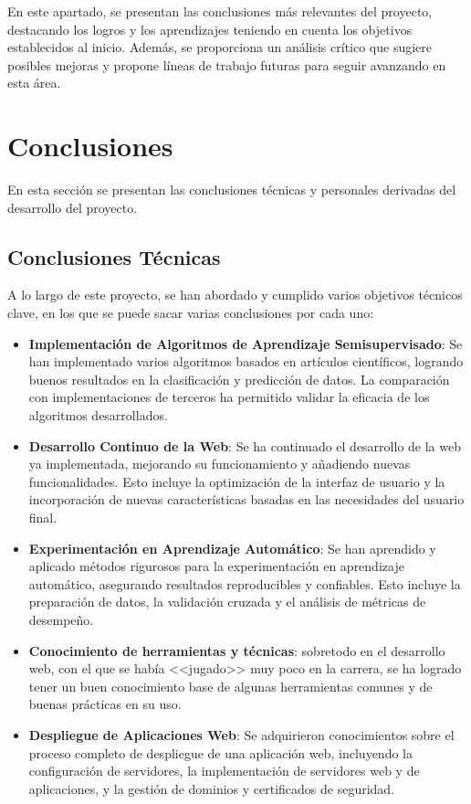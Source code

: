 
En este apartado, se presentan las conclusiones más relevantes del proyecto, destacando los logros y los aprendizajes teniendo en cuenta los objetivos establecidos al inicio. Además, se proporciona un análisis crítico que sugiere posibles mejoras y propone líneas de trabajo futuras para seguir avanzando en esta área.

\section{Conclusiones}

En esta sección se presentan las conclusiones técnicas y personales derivadas del desarrollo del proyecto.

\subsection{Conclusiones Técnicas}

A lo largo de este proyecto, se han abordado y cumplido varios objetivos técnicos clave, en los que se puede sacar varias conclusiones por cada uno:

\begin{itemize}
	\item \textbf{Implementación de Algoritmos de Aprendizaje Semisupervisado}: Se han implementado varios algoritmos basados en artículos científicos, logrando buenos resultados en la clasificación y predicción de datos. La comparación con implementaciones de terceros ha permitido validar la eficacia de los algoritmos desarrollados.
	\item \textbf{Desarrollo Continuo de la Web}: Se ha continuado el desarrollo de la web ya implementada, mejorando su funcionamiento y añadiendo nuevas funcionalidades. Esto incluye la optimización de la interfaz de usuario y la incorporación de nuevas características basadas en las necesidades del usuario final.
	\item \textbf{Experimentación en Aprendizaje Automático}: Se han aprendido y aplicado métodos rigurosos para la experimentación en aprendizaje automático, asegurando resultados reproducibles y confiables. Esto incluye la preparación de datos, la validación cruzada y el análisis de métricas de desempeño.
	\item \textbf{Conocimiento de herramientas y técnicas}: sobretodo en el desarrollo web, con el que se había <<jugado>> muy poco en la carrera, se ha logrado tener un buen conocimiento base de algunas herramientas comunes y de buenas prácticas en su uso.
	\item \textbf{Despliegue de Aplicaciones Web}: Se adquirieron conocimientos sobre el proceso completo de despliegue de una aplicación web, incluyendo la configuración de servidores, la implementación de servidores web y de aplicaciones, y la gestión de dominios y certificados de seguridad. 
\end{itemize}

